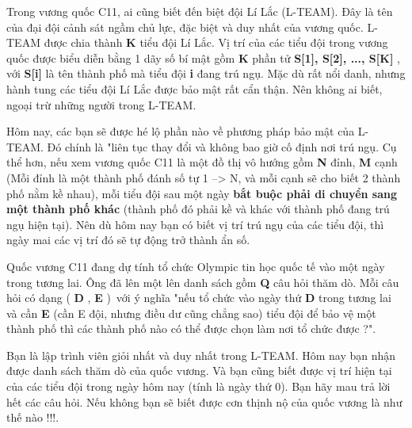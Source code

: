 Trong vương quốc C11, ai cũng biết đến biệt đội Lí Lắc (L-TEAM). Đây là tên của đại đội cảnh sát ngầm chủ lực, đặc biệt và duy nhất của vương quốc. L-TEAM được chia thành   \textbf{    K   }   tiểu đội Lí Lắc. Vị trí của các tiểu đội trong vương quốc được biểu diễn bằng 1 dãy số bí mật gồm   \textbf{    K   }   phần tử   \textbf{    S[1], S[2], ..., S[K]   }   , với   \textbf{    S[i]   }   là tên thành phố mà tiểu đội   \textbf{    i   }   đang trú ngụ. Mặc dù rất nổi danh, nhưng hành tung các tiểu đội Lí Lắc được bảo mật rất cẩn thận. Nên không ai biết, ngoại trừ những người trong L-TEAM.  

   Hôm nay, các bạn sẽ được hé lộ phần nào về phương pháp bảo mật của L-TEAM. Đó chính là "liên tục thay đổi và không bao giờ cố định nơi trú ngụ. Cụ thể hơn, nếu xem vương quốc C11 là một đồ thị vô hướng gồm   \textbf{    N   }   đỉnh,   \textbf{    M   }   cạnh (Mỗi đỉnh là một thành phố đánh số tự 1 --> N, và mỗi cạnh sẽ cho biết 2 thành phố nằm kề nhau),   mỗi tiểu đội sau một ngày    \textbf{     bắt buộc    phải di chuyển sang một thành phố khác   }   (thành phố đó phải kề và khác với thành phố đang trú ngụ hiện tại). Nên dù hôm nay bạn có biết vị trí trú ngụ của các tiểu đội, thì ngày mai các vị trí đó sẽ tự động trở thành ẩn số.  

   Quốc vương C11 đang dự tính tổ chức Olympic tin học quốc tế vào một ngày trong tương lai. Ông đã lên một lên danh sách gồm   \textbf{    Q   }   câu hỏi thăm dò. Mỗi câu hỏi có dạng   \textbf{}   (   \textbf{    D   }   ,   \textbf{    E   }   ) với ý nghĩa "nếu tổ chức vào ngày thứ   \textbf{    D   }   trong tương lai và cần   \textbf{    E   }   (cần E đội, nhưng điều dư cũng chẳng sao) tiểu đội để bảo vệ một thành phố thì các thành phố nào có thể được chọn làm nơi tổ chức được ?".  

   Bạn là lập trình viên giỏi nhất và duy nhất trong L-TEAM. Hôm nay bạn nhận được danh sách thăm dò của quốc vương. Và bạn cũng biết được vị trí hiện tại của các tiểu đội trong ngày hôm nay (tính là ngày thứ 0). Bạn hãy mau trả lời hết các câu hỏi. Nếu không bạn sẽ biết được cơn thịnh nộ của quốc vương là như thế nào !!!.